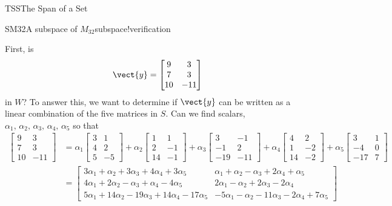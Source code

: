 \begin{subsect}{TSS}{The Span of a Set}
\begin{example}{SM32}{A subspace of $M_{32}$}{subspace!verification}
%
\begin{para}First, is
%
\begin{equation*}
\vect{y}=\begin{bmatrix}
9 & 3 \\ 7 & 3 \\ 10 & -11
\end{bmatrix}
\end{equation*}
%
in $W$?  To answer this, we want to determine if $\vect{y}$ can be written as a linear combination of the five matrices in $S$.  Can we find scalars, $\alpha_1,\,\alpha_2,\,\alpha_3,\,\alpha_4,\,\alpha_5$ so that
%
\begin{align*}
\begin{bmatrix}
9 & 3 \\ 7&3 \\ 10 & -11
\end{bmatrix}
&=
\alpha_1
\begin{bmatrix}
3 & 1 \\ 4 & 2 \\ 5 & -5
\end{bmatrix}
+\alpha_2
\begin{bmatrix}
1 & 1 \\ 2 & -1 \\ 14 & -1
\end{bmatrix}
+\alpha_3
\begin{bmatrix}
3 & -1 \\ -1 & 2 \\ -19 & -11
\end{bmatrix}
+\alpha_4
\begin{bmatrix}
4 & 2 \\ 1 & -2 \\ 14 & -2
\end{bmatrix}
+\alpha_5
\begin{bmatrix}
3 & 1 \\ -4 & 0 \\ -17 & 7
\end{bmatrix}\\
%
&=
\begin{bmatrix}
3\alpha_1 +\alpha_2 +3\alpha_3 +4\alpha_4 +3\alpha_5 &
\alpha_1 +\alpha_2 -\alpha_3 +2\alpha_4 +\alpha_5\\
4\alpha_1 +2\alpha_2 -\alpha_3 +\alpha_4 -4\alpha_5&
2\alpha_1 -\alpha_2 +2\alpha_3 -2\alpha_4 \\
5\alpha_1 +14\alpha_2 -19\alpha_3 +14\alpha_4 -17\alpha_5&
-5\alpha_1 -\alpha_2 -11\alpha_3 -2\alpha_4 +7\alpha_5
\end{bmatrix}
\end{align*}

\end{para}
\end{example}
\end{subsect}
